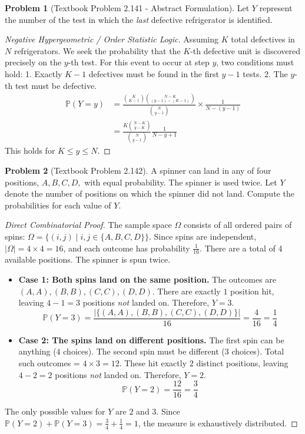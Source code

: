 \documentclass[11pt, letterpaper]{article}
\theoremstyle{definition}
\newtheorem{problem}{Problem}
\renewcommand{\P}{\mathbb{P}}
\begin{document}
\begin{problem}[Textbook Problem 2.141 - Abstract Formulation]
Let $Y$ represent the number of the test in which the \textit{last} defective refrigerator is identified.
\end{problem}
\begin{proof}[Negative Hypergeometric / Order Statistic Logic]
Assuming $K$ total defectives in $N$ refrigerators. We seek the probability that the $K$-th defective unit is discovered precisely on the $y$-th test. 
For this event to occur at step $y$, two conditions must hold:
1. Exactly $K-1$ defectives must be found in the first $y-1$ tests.
2. The $y$-th test must be defective.
\begin{align*}
    \P(Y=y) &= \frac{\binom{K}{K-1} \binom{N-K}{(y-1)-(K-1)}}{\binom{N}{y-1}} \times \frac{1}{N - (y-1)} \\
    &= \frac{K \binom{N-K}{y-K}}{\binom{N}{y-1}} \frac{1}{N-y+1}
\end{align*}
This holds for $K \leq y \leq N$.
\end{proof}

\vspace{0.5cm}

\begin{problem}[Textbook Problem 2.142]
A spinner can land in any of four positions, $A, B, C, D,$ with equal probability. The spinner is used twice. Let $Y$ denote the number of positions on which the spinner did not land. Compute the probabilities for each value of $Y$.
\end{problem}
\begin{proof}[Direct Combinatorial Proof]
The sample space $\Omega$ consists of all ordered pairs of spins: $\Omega = \{ (i, j) \mid i, j \in \{A, B, C, D\} \}$. Since spins are independent, $|\Omega| = 4 \times 4 = 16$, and each outcome has probability $\frac{1}{16}$.
There are a total of 4 available positions. The spinner is spun twice.
\begin{itemize}
    \item \textbf{Case 1: Both spins land on the same position.}
    The outcomes are $(A,A), (B,B), (C,C), (D,D)$. There are exactly $1$ position hit, leaving $4 - 1 = 3$ positions \textit{not} landed on. Therefore, $Y = 3$.
    \[ \P(Y = 3) = \frac{|\{(A,A), (B,B), (C,C), (D,D)\}|}{16} = \frac{4}{16} = \frac{1}{4} \]
    
    \item \textbf{Case 2: The spins land on different positions.}
    The first spin can be anything ($4$ choices). The second spin must be different ($3$ choices). Total such outcomes = $4 \times 3 = 12$. These hit exactly $2$ distinct positions, leaving $4 - 2 = 2$ positions \textit{not} landed on. Therefore, $Y = 2$.
    \[ \P(Y = 2) = \frac{12}{16} = \frac{3}{4} \]
\end{itemize}
The only possible values for $Y$ are $2$ and $3$. Since $\P(Y=2) + \P(Y=3) = \frac{3}{4} + \frac{1}{4} = 1$, the measure is exhaustively distributed.
\end{proof}
\end{document}
